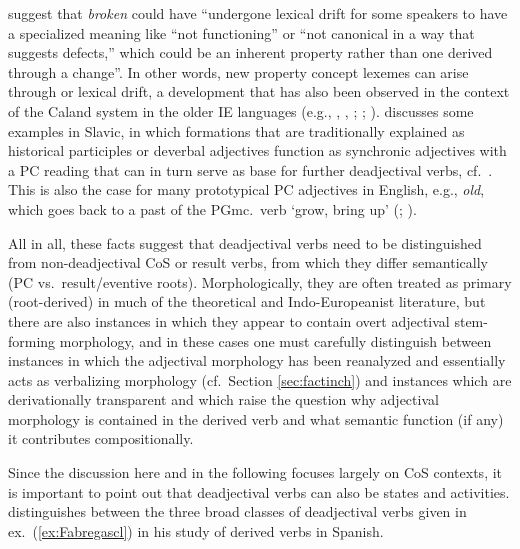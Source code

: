 \documentclass[output=paper,colorlinks,citecolor=brown]{langscibook}
\begin{document}
\largerpage
\citet[72]{BeaversKoontz2020} suggest that \textit{broken} could have ``undergone lexical drift for some speakers to
have a specialized meaning like ``not functioning'' or ``not canonical in a way that suggests defects,'' which could be an inherent property rather than one derived through a change''. In other words, new property concept lexemes can arise through  or lexical drift, a development that has also been observed in the context of the Caland system  in the older IE languages (e.g., \citealt{Nussbaum1976}, \citeyear{Nussbaum2021}, \citeyear{Nussbaum2022}; \citealt[118--126]{Rau2009}; \citealt{Alfieri2016}). \citet[127--138]{Reiter2023} discusses some examples in Slavic, in which formations that are traditionally explained as historical participles or  deverbal adjectives  function as synchronic adjectives with a PC reading that can in turn serve as base for further deadjectival verbs, cf.\ . This is also the case for many prototypical PC adjectives in English, e.g., \textit{old}, which goes back to a past  of the PGmc.\ verb  `grow, bring up'  (; \citealt[449]{Beaversetal2021}).


All in all, these facts suggest that deadjectival verbs need to be distinguished from non-deadjectival CoS  or result verbs, from which they differ semantically (PC vs.\ result/eventive roots). Morphologically, they are often treated as primary (root-derived) in much of the theoretical and Indo-Europeanist literature, but there are also instances in which they appear to contain overt adjectival stem-forming morphology, and in these cases one must carefully distinguish between instances in which the adjectival morphology has been reanalyzed and essentially acts as verbalizing morphology (cf.\ Section \ref{sec:factinch}) and instances which are derivationally transparent and which raise the question why adjectival morphology is contained in the derived verb and what semantic function (if any) it contributes compositionally. 


Since the discussion here and in the following focuses largely on CoS  contexts, it is important to point out that deadjectival verbs can also be states and activities. \citet{Fabregas2023} distinguishes between the three broad classes of deadjectival verbs given in ex.\ (\ref{ex:Fabregascl}) in his study of derived verbs in Spanish.  
\end{document}
